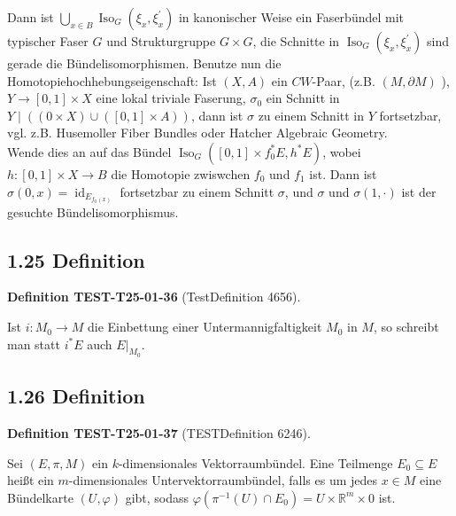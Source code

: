 \documentclass[10pt, letterpaper]{article}
\newcommand{\CustomHeading}[3]{%
  \par\medskip\noindent%
  \textbf{#1 #2} \textnormal{(#3)}.\enskip%
}
\newenvironment{DEF}[2]{\begin{unitbox}\CustomHeading{Definition}{#1}{#2}}{\end{unitbox}}
\begin{document}
Dann ist $\bigcup_{x \in B} \operatorname{Iso}_{G}\left(\xi_{x}, \xi_{x}^{\prime}\right)$ in kanonischer Weise ein Faserbündel mit typischer Faser $G$ und Strukturgruppe $G \times G$, die Schnitte in $\operatorname{Iso}_{G}\left(\xi_{x}, \xi_{x}^{\prime}\right)$ sind gerade die Bündelisomorphismen. Benutze nun die Homotopiehochhebungseigenschaft: Ist $(X, A)$ ein $C W$-Paar, (z.B. $(M, \partial M)$ ), $Y \rightarrow[0,1] \times X$ eine lokal triviale Faserung, $\sigma_{0}$ ein Schnitt in $Y \mid((0 \times X) \cup([0,1] \times A))$, dann ist $\sigma$ zu einem Schnitt in $Y$ fortsetzbar, vgl. z.B. Husemoller Fiber Bundles oder Hatcher Algebraic Geometry.\\
Wende dies an auf das Bündel $\operatorname{Iso}_{G}\left([0,1] \times f_{0}^{*} E, h^{*} E\right)$, wobei $h:[0,1] \times X \rightarrow B$ die Homotopie zwiswchen $f_{0}$ und $f_{1}$ ist. Dann ist $\sigma(0, x)=\operatorname{id}_{E_{f_{0}(x)}}$ fortsetzbar zu einem Schnitt $\sigma$, und $\sigma$ und $\sigma(1, \cdot)$ ist der gesuchte Bündelisomorphismus.

\subsection*{1.25 Definition}
\begin{DEF}{TEST-T25-01-36}{TestDefinition 4656}
Ist $i: M_{0} \rightarrow M$ die Einbettung einer Untermannigfaltigkeit $M_{0}$ in $M$, so schreibt man statt $i^{*} E$ auch $\left.E\right|_{M_{0}}$.
\end{DEF}

\subsection*{1.26 Definition}
\begin{DEF}{TEST-T25-01-37}{TESTDefinition 6246}
Sei $(E, \pi, M)$ ein $k$-dimensionales Vektorraumbündel. Eine Teilmenge $E_{0} \subseteq E$ heißt ein $m$-dimensionales Untervektorraumbündel, falls es um jedes $x \in M$ eine Bündelkarte $(U, \varphi)$ gibt, sodass $\varphi\left(\pi^{-1}(U) \cap E_{0}\right)=U \times \mathbb{R}^{m} \times 0$ ist.
\end{DEF}
\end{document}
